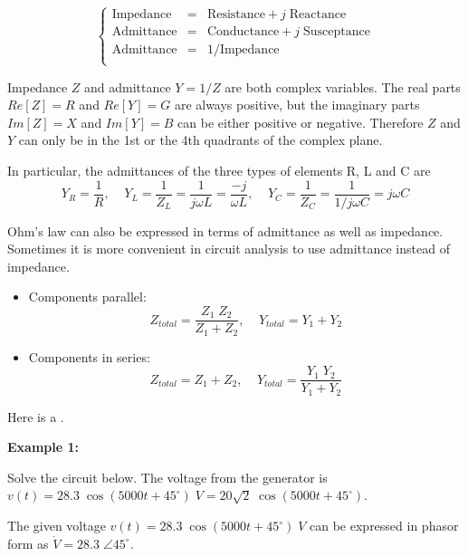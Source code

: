 \[
\left\{\begin{array}{rcl}
 \mbox{Impedance} &=& \mbox{Resistance} + j \;\mbox{Reactance} \\
 \mbox{Admittance} &=& \mbox{Conductance} + j\; \mbox{Susceptance} \\
 \mbox{Admittance}&=&1/\mbox{Impedance}\\
 \end{array}\right.
\]

Impedance $Z$ and admittance $Y=1/Z$ are both complex variables. The 
real parts $Re[Z]=R$ and $Re[Y]=G$ are always positive, but the imaginary 
parts $Im[Z]=X$ and $Im[Y]=B$ can be either positive or negative. Therefore
$Z$ and $Y$ can only be in the 1st or the 4th quadrants of the complex plane.

In particular, the admittances of the three types of elements R, L
and C are
\[ Y_R=\frac{1}{R},\;\;\;\;
Y_L=\frac{1}{Z_L}=\frac{1}{j\omega L}=\frac{-j}{\omega L},\;\;\;\;
Y_C=\frac{1}{Z_C}=\frac{1}{1/j\omega C}=j\omega C	\]

Ohm's law can also be expressed in terms of admittance as well as 
impedance. Sometimes it is more convenient in circuit analysis to use 
admittance instead of impedance.
\begin{itemize}
\item Components parallel:
  \[ Z_{total}=\frac{Z_1\;Z_2}{Z_1+Z_2},\;\;\;\;Y_{total}=Y_1+Y_2 \]
\item Components in series:
  \[ Z_{total}=Z_1+Z_2,\;\;\;\;Y_{total}=\frac{Y_1\;Y_2}{Y_1+Y_2}\]
\end{itemize}

Here is a 
.


{\bf Example 1:} 

Solve the circuit below. The voltage from the generator is 
$v(t)=28.3\;\cos(5000t+45^\circ)\;V=20\sqrt{2}\;\cos(5000t+45^\circ)$.


The given voltage $v(t)=28.3\;\cos(5000t+45^\circ)\;V$ can be expressed
in phasor form as $\dot{V}=28.3\;\angle{45^\circ}$.

